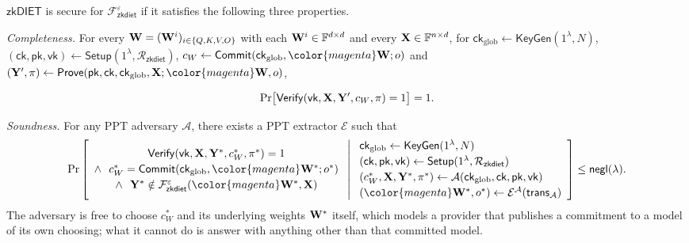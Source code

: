 \documentclass[sigconf,anonymous,review,balance=false]{acmart}
\newcommand{\rev}[1]{{\color{magenta}#1}}
\begin{document}
\begin{definition}
\label{def:zkdiet}
$\mathsf{zkDIET}$ is secure for $\mathcal{F}^{\varepsilon}_{\mathsf{zkdiet}}$ if it satisfies the following three properties.
    
\smallskip
\noindent\emph{Completeness.} For every \rev{${\mathbf{W}} = ({\mathbf{W}}^{i})_{i \in \{Q,K,V,O\}}$ with each ${\mathbf{W}}^{i} \in \mathbb{F}^{d \times d}$} and every ${\mathbf{X}} \in \mathbb{F}^{n \times d}$, for $\mathsf{ck}_{\mathrm{glob}} \leftarrow \mathsf{KeyGen}(1^{\lambda}, N)$, $(\mathsf{ck}, \mathsf{pk}, \mathsf{vk}) \leftarrow \mathsf{Setup}(1^{\lambda}, \mathcal{R}_{\mathsf{zkdiet}})$, $c_{W} \leftarrow \mathsf{Commit}(\mathsf{ck}_{\mathrm{glob}}, \rev{\W}; o)$ and $(\Y', \pi) \leftarrow \mathsf{Prove}(\mathsf{pk}, \mathsf{ck}, \mathsf{ck}_{\mathrm{glob}}, \X; \rev{\W}, o)$,

\[
    \Pr\bigl[\mathsf{Verify}(\mathsf{vk}, {\mathbf{X}}, {\mathbf{Y}}', c_{W}, \pi) = 1\bigr] = 1 .
\]
    

\noindent\emph{Soundness.} For any PPT adversary $\mathcal{A}$, there exists a PPT extractor $\mathcal{E}$ such that
\[
  \Pr \left[
  \begin{array}{c}
    \mathsf{Verify}(\mathsf{vk}, \X, \Y^{*}, c_{W}^{*}, \pi^{*}) = 1 \\[2pt]
    \land\ \ c_{W}^{*} = \mathsf{Commit}(\mathsf{ck}_{\mathrm{glob}}, \rev{\W^{*}}; o^{*}) \\[2pt]
    \land\ \ \Y^{*} \notin \mathcal{F}^{\varepsilon}_{\mathsf{zkdiet}}(\rev{\W^{*}}, \X)
  \end{array}
  \;\middle|\;
  \begin{array}{l}
    \mathsf{ck}_{\mathrm{glob}} \leftarrow \mathsf{KeyGen}(1^{\lambda}, N) \\[2pt]
    (\mathsf{ck}, \mathsf{pk}, \mathsf{vk}) \leftarrow \mathsf{Setup}(1^{\lambda}, \mathcal{R}_{\mathsf{zkdiet}}) \\[2pt]
    (c_{W}^{*}, \X, \Y^{*}, \pi^{*}) \leftarrow \mathcal{A}(\mathsf{ck}_{\mathrm{glob}}, \mathsf{ck}, \mathsf{pk}, \mathsf{vk}) \\[2pt]
    (\rev{\W^{*}}, o^{*}) \leftarrow \mathcal{E}^{\mathcal{A}}(\mathsf{trans}_{\mathcal{A}})
  \end{array}
  \right] \le \mathsf{negl}(\lambda).
\]
The adversary is free to choose $c_{W}^*$ and its underlying weights \rev{${\mathbf{W}}^*$} itself, which models a provider that publishes a commitment to a model of its own choosing; what it cannot do is answer with anything other than that committed model.


\end{definition}
\end{document}
